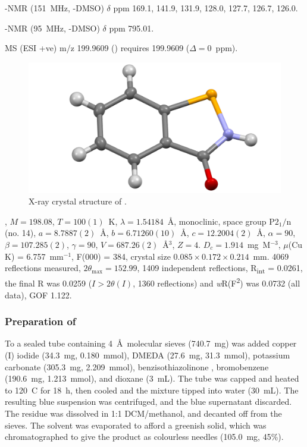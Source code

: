 \begin{refsection}
-NMR (151~MHz, -DMSO) $\delta$ ppm 169.1, 141.9, 131.9, 128.0, 127.7, 126.7, 126.0.

-NMR (95~MHz, -DMSO) $\delta$ ppm 795.01.

MS (ESI +ve) m/z 199.9609 ()  requires 199.9609 ($\Delta=0$~ppm).

\begin{figure}
    \includegraphics[width=0.8\linewidth]{Figures/ebs-h-xtal.pdf}
    \caption{X-ray crystal structure of .}
\end{figure}

, $M=198.08$, $T=100(1)$~K, $\lambda=1.54184$~\AA, monoclinic, space group $\text{P}2_1/\text{n}$ (no. 14), $a = 8.7887(2)$~\AA, $b = 6.71260(10)$~\AA, $c = 12.2004(2)$~\AA, $\alpha = 90$\degree, $\beta = 107.285(2)$\degree, $\gamma = 90$\degree, $V = 687.26(2)$~\AA$^{3}$, $Z = 4$. $D_{c}= 1.914$~mg~M$^{-3}$, $\mu$(Cu K\a) = 6.757~mm$^{-1}$, F(000) = 384, crystal size $0.085 \times 0.172 \times 0.214$~mm. 4069 reflections measured, $2\theta_{\max}=152.99$\degree, 1409 independent reflections, R\textsubscript{int} = 0.0261, the final R was 0.0259 ($I > 2\theta(I)$, 1360 reflections) and \emph{w}R(F\textsuperscript{2}) was 0.0732 (all data), GOF 1.122. 

\subsubsection{Preparation of }
To a sealed tube containing 4~\AA\ molecular sieves (740.7~mg) was added copper (I) iodide (34.3~mg, 0.180~mmol), DMEDA (27.6~mg, 31.3~mmol), potassium carbonate (305.3~mg, 2.209~mmol), benzisothiazolinone , bromobenzene (190.6~mg, 1.213~mmol), and dioxane (3~mL).
The tube was capped and heated to 120~\degree{}C for 18~h, then cooled and the mixture tipped into water (30~mL). The resulting blue suspension was centrifuged, and the blue supernatant discarded. The residue was dissolved in 1:1 DCM/methanol, and decanted off from the sieves.
The solvent was evaporated to afford a greenish solid, which was chromatographed to give the product as colourless needles (105.0~mg, 45\%).\autocite{Dahl2011}


\end{refsection}
